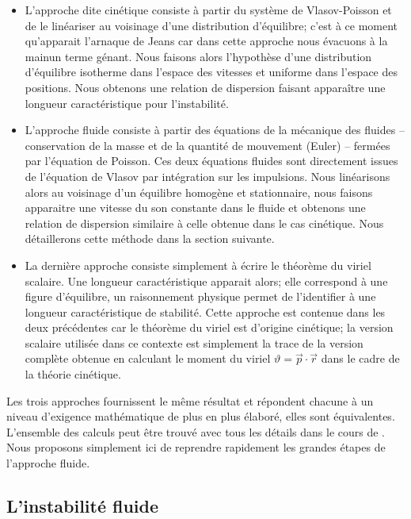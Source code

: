 \begin{itemize}

	\item L'approche dite cinétique consiste à partir du système de Vlasov-Poisson et de le linéariser au voisinage d'une distribution
		d'équilibre; c'est à ce moment qu'apparait l'arnaque de Jeans car dans cette approche nous évacuons \og à la main\fg un terme génant.
		Nous faisons alors l'hypothèse d'une distribution d'équilibre isotherme dans l'espace des vitesses et uniforme dans l'espace des
		positions. Nous obtenons une relation de dispersion faisant apparaître une longueur caractéristique pour l'instabilité.

	\item L'approche fluide consiste à partir des équations de la mécanique des fluides  -- conservation de la masse et de la quantité de
		mouvement (Euler) -- fermées par l'équation de Poisson. Ces deux équations fluides sont directement issues de l'équation de Vlasov par
		intégration sur les impulsions. Nous linéarisons alors au voisinage d'un équilibre homogène et stationnaire, nous faisons apparaitre
		une vitesse du son constante dans le fluide et obtenons une relation de dispersion similaire à celle obtenue dans le cas
		cinétique. Nous détaillerons cette méthode dans la section suivante.

	\item La dernière approche consiste simplement à écrire le théorème du viriel scalaire. Une longueur caractéristique apparait alors; elle
		correspond  à une figure d'équilibre, un raisonnement physique permet de l'identifier à une longueur caractéristique de stabilité.
		Cette approche est contenue dans les deux précédentes car le théorème du viriel est d'origine cinétique; la version scalaire utilisée
		dans ce contexte est simplement la trace de la version complète obtenue en calculant le moment du viriel $\vartheta=\vec p \cdot \vec
		r$ dans le cadre de la théorie cinétique.

\end{itemize}

Les trois approches fournissent le même résultat et répondent chacune à un niveau d'exigence mathématique de plus en plus élaboré, elles sont
équivalentes. L'ensemble des calculs peut être trouvé avec tous les détails dans le cours de \cite{CoursJP}. Nous proposons simplement ici
de reprendre rapidement les grandes étapes de l'approche fluide.

\subsection{L'instabilité fluide}

